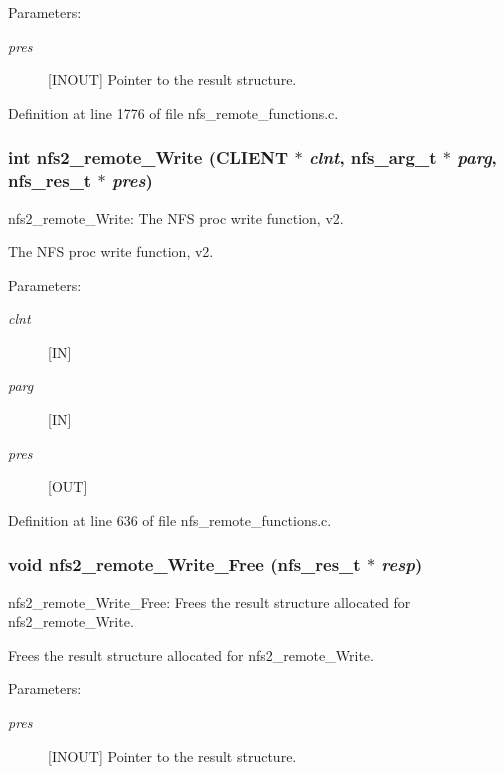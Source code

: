 \begin{Desc}
\item[Parameters:]
\begin{description}
\item[{\em pres}][INOUT] Pointer to the result structure. \end{description}
\end{Desc}


Definition at line 1776 of file nfs\_\-remote\_\-functions.c.
\subsubsection{\setlength{\rightskip}{0pt plus 5cm}int nfs2\_\-remote\_\-Write (CLIENT $\ast$ {\em clnt}, nfs\_\-arg\_\-t $\ast$ {\em parg}, nfs\_\-res\_\-t $\ast$ {\em pres})}\label{group__NFSprocs_ga8}


nfs2\_\-remote\_\-Write: The NFS proc write function, v2.

The NFS proc write function, v2.

\begin{Desc}
\item[Parameters:]
\begin{description}
\item[{\em clnt}][IN] \item[{\em parg}][IN] \item[{\em pres}][OUT] \end{description}
\end{Desc}


Definition at line 636 of file nfs\_\-remote\_\-functions.c.
\subsubsection{\setlength{\rightskip}{0pt plus 5cm}void nfs2\_\-remote\_\-Write\_\-Free (nfs\_\-res\_\-t $\ast$ {\em resp})}\label{group__NFSprocs_ga59}


nfs2\_\-remote\_\-Write\_\-Free: Frees the result structure allocated for nfs2\_\-remote\_\-Write.

Frees the result structure allocated for nfs2\_\-remote\_\-Write.

\begin{Desc}
\item[Parameters:]
\begin{description}
\item[{\em pres}][INOUT] Pointer to the result structure. \end{description}
\end{Desc}


